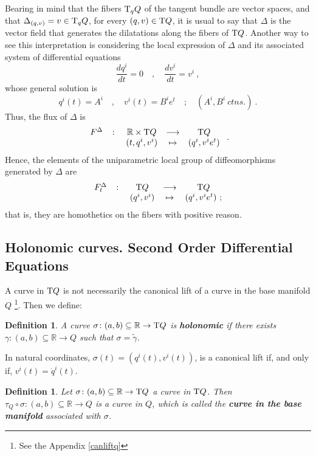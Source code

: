 \documentclass[12pt]{report}
\newtheorem{definition}[teor]{Definition}
\def\Real{\mathbb{R}}
\def\Tan{{\rm T}}
\begin{document}
Bearing in mind that the fibers $\Tan_qQ$ of the
tangent bundle are vector spaces, and that
$\Delta_{(q,v)}=v\in\Tan_qQ$, for every $(q,v)\in\Tan Q$, 
it is usual to say that $\Delta$ is the vector field that generates
the dilatations along the fibers of $\Tan Q$.
Another way to see this interpretation is considering the local
expression of $\Delta$ and its associated system of differential equations
$$
\frac{d q^i}{d t}=0 \quad , \quad
\frac{d v^i}{d t}=v^i \ ,
$$
whose general solution is
$$
q^i(t)=A^i \quad ,\quad
v^i(t)=B^ie^t \quad ;\quad (A^i,B^i \ ctns.) \ .
$$
Thus, the flux of $\Delta$ is
$$
\begin{array}{ccccc}
F^\Delta&\colon&\Real\times\Tan Q&\longrightarrow&\Tan Q \\
 & & (t,q^i,v^i) & \mapsto & (q^i,v^ie^t) 
\end{array} \ .
$$
Hence, the elements of the uniparametric local group of diffeomorphisms generated by $\Delta$ are
$$
\begin{array}{ccccc}
F^\Delta_t&\colon&\Tan Q&\longrightarrow&\Tan Q \\
 & & (q^i,v^i) & \mapsto & (q^i,v^ie^t) \ ;
\end{array}
$$
that is, they are homothetics on the fibers with positive reason.


\subsection{Holonomic curves. Second Order Differential Equations}


A curve in $\Tan Q$ is not necessarily the canonical lift
of a curve in the base manifold $Q$
\footnote{
See the Appendix \ref{canliftq}}. 
Then we define:

\begin{definition}
A curve $\sigma\colon (a,b)\subseteq\Real\to\Tan Q$ is
\textbf{holonomic} if there exists $\gamma\colon (a,b)\subseteq\Real\to Q$
such that $\sigma=\widetilde\gamma$.
\end{definition}

In natural coordinates, $\sigma(t)=(q^i(t),v^i(t))$,
is a canonical lift if, and only if,
$v^i(t)=\dot q^i(t)$.
 
\begin{definition}
Let $\sigma\colon (a,b)\subseteq\Real\to\Tan Q$ a curve
in $\Tan Q$. Then $\tau_Q\circ\sigma\colon (a,b)\subseteq\Real\to Q$
is a curve in $Q$, which is called the
\textbf{curve in the base manifold} associated with $\sigma$.
\end{definition}
\end{document}
